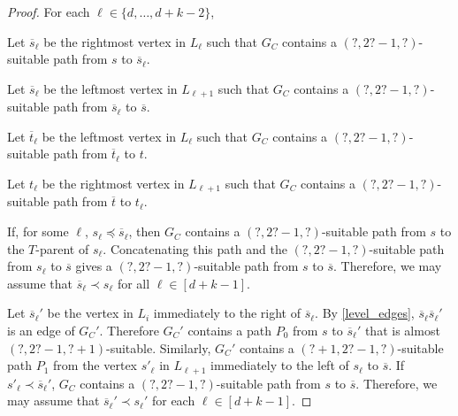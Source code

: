 \documentclass{patmorin}
\begin{document}
\begin{proof}
  For each $\ell\in\{d,\ldots,d+k-2\}$,
  \begin{compactitem}
    \item Let $\overline{s}_\ell$ be the rightmost vertex in $L_\ell$ such that $G_C$ contains a $(?,2?-1,?)$-suitable path from $s$ to $\overline{s}_\ell$.
    \item Let $\overline{s}_\ell$ be the leftmost vertex in $L_{\ell+1}$ such that $G_C$ contains a $(?,2?-1,?)$-suitable path from $\overline{s}_\ell$ to $\overline{s}$.
    \item Let $\overline{t}_\ell$ be the leftmost vertex in $L_\ell$ such that $G_C$ contains a $(?,2?-1,?)$-suitable path from $\overline{t}_\ell$ to $t$.
    \item Let $t_\ell$ be the rightmost vertex in $L_{\ell+1}$ such that $G_C$ contains a $(?,2?-1,?)$-suitable path from $\overline{t}$ to $t_{\ell}$.
  \end{compactitem}

  If, for some $\ell$, $s_\ell\preceq \overline{s}_\ell$, then $G_C$ contains a $(?,2?-1,?)$-suitable path from $s$ to the $T$-parent of $s_\ell$.  Concatenating this path and the $(?,2?-1,?)$-suitable path from $s_\ell$ to $\overline{s}$ gives a $(?,2?-1,?)$-suitable path from $s$ to $\overline{s}$.  Therefore, we may assume that $\overline{s}_\ell \prec s_\ell$ for all $\ell\in[d+k-1]$.

  Let $\overline{s}_\ell'$ be the vertex in $L_i$ immediately to the right of $\overline{s}_\ell$.  By \cref{level_edges}, $\overline{s}_\ell\overline{s}_\ell'$ is an edge of $G_C'$.  Therefore $G_C'$ contains a path $P_0$ from $s$ to $\overline{s}_\ell'$ that is almost $(?,2?-1,?+1)$-suitable.  Similarly, $G_C'$ contains a $(?+1,2?-1,?)$-suitable path $P_1$ from the vertex $s'_\ell$ in $L_{\ell+1}$ immediately to the left of $s_\ell$ to $\overline{s}$.  If $s'_\ell \prec \overline{s}_\ell'$, $G_C$ contains a $(?,2?-1,?)$-suitable path from $s$ to $\overline{s}$.  Therefore, we may assume that $\overline{s}_\ell'\prec s_{\ell}'$ for each $\ell\in[d+k-1]$.

\end{proof}
\end{document}
